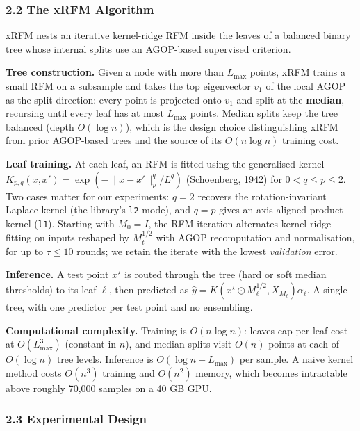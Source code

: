 \documentclass[
  11pt,
  onecolumn]{article}
\begin{document}
\subsubsection{2.2 The xRFM Algorithm}\label{the-xrfm-algorithm}

xRFM nests an iterative kernel-ridge RFM inside the leaves of a balanced
binary tree whose internal splits use an AGOP-based supervised
criterion.

\textbf{Tree construction.} Given a node with more than
\(L_{\max}\) points, xRFM trains a small RFM on a subsample and takes
the top eigenvector \(v_1\) of the local AGOP as the split direction:
every point is projected onto \(v_1\) and split at the
\textbf{median}, recursing until every leaf has at most \(L_{\max}\)
points. Median splits keep the tree balanced (depth \(O(\log n)\)),
which is the design choice distinguishing xRFM from prior AGOP-based trees and
the source of its \(O(n \log n)\) training cost.

\textbf{Leaf training.} At each leaf, an RFM is fitted using
the generalised kernel \(K_{p,q}(x, x') = \exp(-\|x - x'\|_p^q / L^q)\)
(Schoenberg, 1942) for \(0 < q \le p \le 2\). Two cases matter for our
experiments: \(q = 2\) recovers the rotation-invariant Laplace kernel
(the library's \texttt{l2} mode), and \(q = p\) gives an axis-aligned
product kernel (\texttt{l1}). Starting with \(M_0 = I\), the RFM
iteration alternates kernel-ridge fitting on inputs reshaped by
\(M_t^{1/2}\) with AGOP recomputation and normalisation, for up to
\(\tau \le 10\) rounds; we retain the iterate with the lowest
\emph{validation} error.

\textbf{Inference.} A test point \(x^\star\) is routed through the tree
(hard or soft median thresholds) to its leaf \(\ell\), then predicted as
\(\hat y = K(x^\star \odot M_\ell^{1/2}, X_{M_\ell}) \alpha_\ell\). A
single tree, with one predictor per test point and no ensembling.

\textbf{Computational complexity.} Training is \(O(n \log n)\): leaves
cap per-leaf cost at \(O(L_{\max}^3)\) (constant in \(n\)), and median
splits visit \(O(n)\) points at each of \(O(\log n)\) tree levels.
Inference is \(O(\log n + L_{\max})\) per sample. A naive kernel method
costs \(O(n^3)\) training and \(O(n^2)\) memory, which becomes
intractable above roughly 70,000 samples on a 40 GB GPU.

\subsubsection{2.3 Experimental Design}\label{experimental-design}
\end{document}
